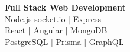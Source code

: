 \textbf{Full Stack Web Development} \\
\midrule
Node.js socket.io $|$ Express \\
React $|$ Angular $|$ MongoDB \\
PostgreSQL $|$ Prisma $|$ GraphQL 